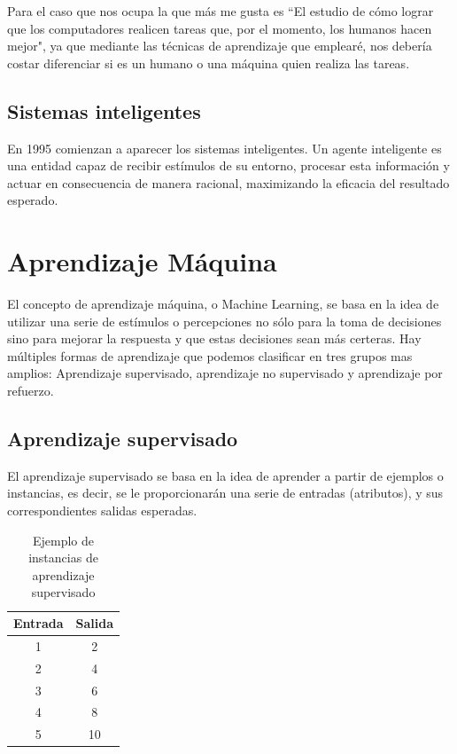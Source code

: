 Para el caso que nos ocupa la que más me gusta es ``El estudio de cómo lograr que los computadores realicen tareas que, por el momento, los humanos hacen mejor", ya que mediante las técnicas de aprendizaje que emplearé, nos debería costar diferenciar si es un humano o una máquina quien realiza las tareas.

\subsection{Sistemas inteligentes}
\cite{wiki:Agente_Inteligente} En 1995 comienzan a aparecer los sistemas inteligentes.  Un agente inteligente es una entidad capaz de recibir estímulos de su entorno, procesar esta información y actuar en consecuencia de manera racional, maximizando la eficacia del resultado esperado.


\section{Aprendizaje Máquina}

El concepto de aprendizaje máquina, o Machine Learning, se basa en la idea de utilizar una serie de estímulos o percepciones no sólo para la toma de decisiones sino para mejorar la respuesta y que estas decisiones sean más certeras. Hay múltiples formas de aprendizaje que podemos clasificar en tres grupos mas amplios: Aprendizaje supervisado, aprendizaje no supervisado y aprendizaje por refuerzo.


\subsection{Aprendizaje supervisado}

El aprendizaje supervisado se basa en la idea de aprender a partir de ejemplos o instancias, es decir, se le proporcionarán una serie de entradas (atributos), y sus correspondientes salidas esperadas.

\begin{table}[h]
\centering
\begin{tabular}{|c|c|}
\hline
\rowcolor[HTML]{C0C0C0} 
Entrada & Salida \\ \hline
1       & 2      \\ \hline
2       & 4      \\ \hline
3       & 6      \\ \hline
4       & 8     \\ \hline
5       & 10     \\ \hline
\end{tabular}
\caption{Ejemplo de instancias de aprendizaje supervisado}
\label{my-label}
\end{table}

